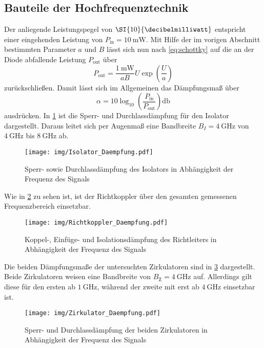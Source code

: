 \subsection{Bauteile der Hochfrequenztechnik}
	
	Der anliegende Leistungspegel von $\SI{10}{\decibelmilliwatt}$ entspricht einer eingehenden Leistung von $P_\text{in}=\SI{10}{\milli\watt}$. 
	Mit Hilfe der im vorigen Abschnitt bestimmten Parameter $a$ und $B$ lässt sich nun nach \cref{eq:schottky} auf die an der Diode abfallende Leistung $P_\text{out}$ über
	\begin{equation}
		P_\text{out}=\frac{\SI{1}{\milli\watt}}{a B} U \exp(\frac{U}{a})
	\end{equation}
	zurückschließen. 
	Damit lässt sich im Allgemeinen das Dämpfungsmaß über
	\begin{equation}
		\alpha=10 \log_{10}\left(\frac{P_\text{in}}{P_\text{out}}\right) \si{\decibel}
	\end{equation}
	ausdrücken. 
	In \cref{fig:isolator_daempfung} ist die Sperr- und Durchlassdämpfung für den Isolator dargestellt. 
	Daraus leitet sich per Augenmaß eine Bandbreite $B_I=\SI{4}{\giga\hertz}$ von $\SI{4}{\giga\hertz}$ bis $\SI{8}{\giga\hertz}$ ab.
	\begin{figure}[H]
		\centering
		\texttt{[image: img/Isolator\_Daempfung.pdf]}
		\caption{Sperr- sowie Durchlassdämpfung des Isolators in Abhängigkeit der Frequenz des Signals}
		\label{fig:isolator_daempfung}
	\end{figure}
	Wie in \cref{fig:richtkoppler_daempfung} zu sehen ist, ist der Richtkoppler über den gesamten gemessenen Frequenzbereich einsetzbar.
	\begin{figure}[H]
		\centering
		\texttt{[image: img/Richtkoppler\_Daempfung.pdf]}
		\caption{Koppel-, Einfüge- und Isolationsdämpfung des Richtleiters in Abhängigkeit der Frequenz des Signals}
		\label{fig:richtkoppler_daempfung}
	\end{figure}
	Die beiden Dämpfungsmaße der untersuchten Zirkulatoren sind in \cref{fig:zirkulator_daempfung} dargestellt. 
	Beide Zirkulatoren weisen eine Bandbreite von $B_\text{Z}=\SI{4}{\giga\hertz}$ auf. 
	Allerdings gilt diese für den ersten ab $\SI{1}{\giga\hertz}$, während der zweite mit erst ab $\SI{4}{\giga\hertz}$ einsetzbar ist.
	\begin{figure}[H]
		\centering
		\texttt{[image: img/Zirkulator\_Daempfung.pdf]}
		\caption{Sperr- und Durchlassdämpfung der beiden Zirkulatoren in Abhängigkeit der Frequenz des Signals}
		\label{fig:zirkulator_daempfung}
	\end{figure}

